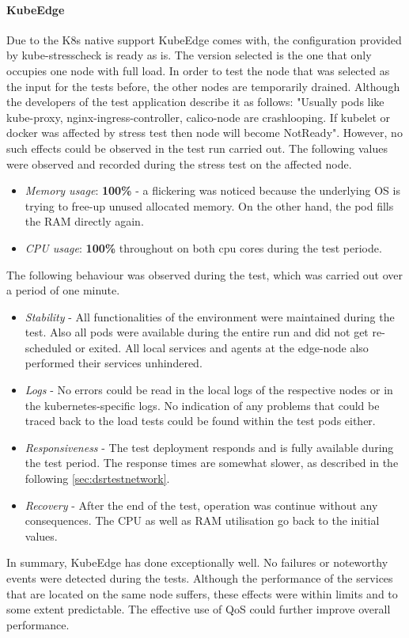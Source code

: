 \documentclass[MSC,Master,english]{twbook}%
\begin{document}
\paragraph{KubeEdge} Due to the \ac{K8s} native support KubeEdge comes with, the configuration provided by kube-stresscheck is ready as is. The version selected is the one that only occupies one node with full load. In order to test the node that was selected as the input for the tests before, the other nodes are temporarily drained. Although the developers of the test application describe it as follows: "Usually pods like kube-proxy, nginx-ingress-controller, calico-node are crashlooping. If kubelet or docker was affected by stress test then node will become NotReady"\cite{kube-stress}. However, no such effects could be observed in the test run carried out. The following values were observed and recorded during the stress test on the affected node. 

\begin{itemize}
    \item \textit{Memory usage}: \textbf{100\%} - a flickering was noticed because the underlying \ac{OS} is trying to free-up unused allocated memory. On the other hand, the pod fills the \ac{RAM} directly again.
    \item \textit{CPU usage}: \textbf{100\%} throughout on both cpu cores during the test periode. 
\end{itemize}
The following behaviour was observed during the test, which was carried out over a period of one minute.

\begin{itemize} 
    \item \textit{Stability} - All functionalities of the environment were maintained during the test. Also all pods were available during the entire run and did not get re-scheduled or exited. All local services and agents at the edge-node also performed their services unhindered.
    \item \textit{Logs} - No errors could be read in the local logs of the respective nodes or in the kubernetes-specific logs. No indication of any problems that could be traced back to the load tests could be found within the test pods either.
    \item \textit{Responsiveness} - The test deployment responds and is fully available during the test period. The response times are somewhat slower, as described in the following \autoref{sec:dsrtestnetwork}.
    \item \textit{Recovery} - After the end of the test, operation was continue without any consequences. The CPU as well as RAM utilisation go back to the initial values. 
\end{itemize}
In summary, KubeEdge has done exceptionally well. No failures or noteworthy events were detected during the tests. Although the performance of the services that are located on the same node suffers, these effects were within limits and to some extent predictable. The effective use of \ac{QoS} could further improve overall performance.
\end{document}
